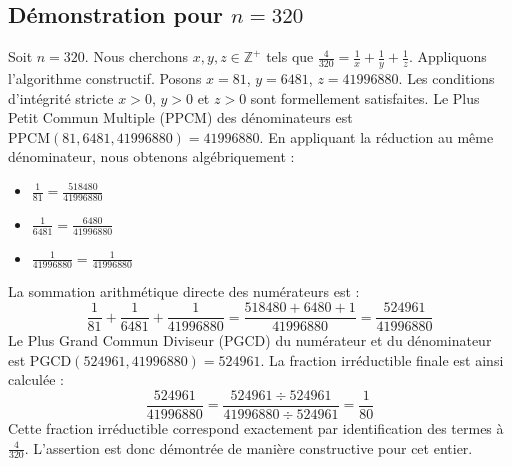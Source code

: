 \documentclass[11pt,a4paper]{article}
\begin{document}
\subsection{Démonstration pour $n = 320$}
Soit $n = 320$. Nous cherchons $x, y, z \in \mathbb{Z}^{+}$ tels que $\frac{4}{320} = \frac{1}{x} + \frac{1}{y} + \frac{1}{z}$.
Appliquons l'algorithme constructif. Posons $x = 81$, $y = 6481$, $z = 41996880$.
Les conditions d'intégrité stricte $x > 0$, $y > 0$ et $z > 0$ sont formellement satisfaites.
Le Plus Petit Commun Multiple (PPCM) des dénominateurs est $\text{PPCM}(81, 6481, 41996880) = 41996880$.
En appliquant la réduction au même dénominateur, nous obtenons algébriquement :
\begin{itemize}
    \item $\frac{1}{81} = \frac{518480}{41996880}$
    \item $\frac{1}{6481} = \frac{6480}{41996880}$
    \item $\frac{1}{41996880} = \frac{1}{41996880}$
\end{itemize}
La sommation arithmétique directe des numérateurs est :
$$ \frac{1}{81} + \frac{1}{6481} + \frac{1}{41996880} = \frac{518480 + 6480 + 1}{41996880} = \frac{524961}{41996880} $$
Le Plus Grand Commun Diviseur (PGCD) du numérateur et du dénominateur est $\text{PGCD}(524961, 41996880) = 524961$.
La fraction irréductible finale est ainsi calculée :
$$ \frac{524961}{41996880} = \frac{524961 \div 524961}{41996880 \div 524961} = \frac{1}{80} $$
Cette fraction irréductible correspond exactement par identification des termes à $\frac{4}{320}$. L'assertion est donc démontrée de manière constructive pour cet entier.
\end{document}
